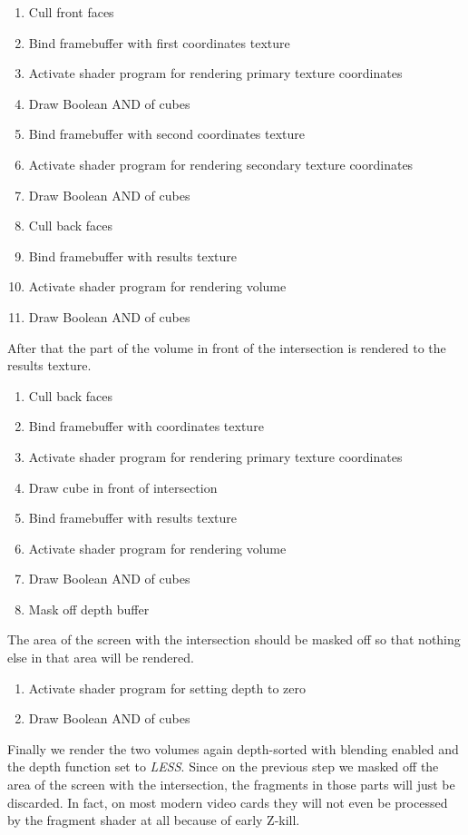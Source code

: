 \documentclass{article}
\begin{document}
\begin{enumerate}
  \item Cull front faces
  \item Bind framebuffer with first coordinates texture
  \item Activate shader program for rendering primary texture coordinates
  \item Draw Boolean AND of cubes
  \item Bind framebuffer with second coordinates texture
  \item Activate shader program for rendering secondary texture coordinates
  \item Draw Boolean AND of cubes
  \item Cull back faces
  \item Bind framebuffer with results texture
  \item Activate shader program for rendering volume
  \item Draw Boolean AND of cubes
\end{enumerate}

After that the part of the volume in front of the intersection is rendered to
the results texture.

\begin{enumerate}
  \item Cull back faces
  \item Bind framebuffer with coordinates texture
  \item Activate shader program for rendering primary texture coordinates
  \item Draw cube in front of intersection
  \item Bind framebuffer with results texture
  \item Activate shader program for rendering volume
  \item Draw Boolean AND of cubes
  \item Mask off depth buffer
\end{enumerate}

The area of the screen with the intersection should be masked off so that
nothing else in that area will be rendered.

\begin{enumerate}
  \item Activate shader program for setting depth to zero
  \item Draw Boolean AND of cubes
\end{enumerate}

Finally we render the two volumes again depth-sorted with blending enabled and
the depth function set to \emph{LESS}.  Since on the previous step we masked off
the area of the screen with the intersection, the fragments in those parts will
just be discarded.  In fact, on most modern video cards they will not even be
processed by the fragment shader at all because of early Z-kill.
\end{document}
